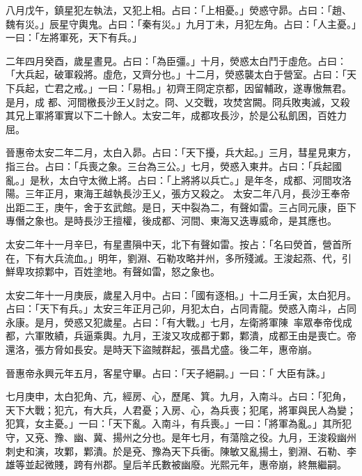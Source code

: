 \begin{pinyinscope}
 八月戊午，鎮星犯左執法，又犯上相。占曰：「上相憂。」熒惑守昴。占曰：「趙、魏有災。」辰星守輿鬼。占曰：「秦有災。」九月丁未，月犯左角。占曰：「人主憂。」一曰：「左將軍死，天下有兵。」



 二年四月癸酉，歲星晝見。占曰：「為臣彊。」十月，熒惑太白鬥于虛危。占曰：「大兵起，破軍殺將。虛危，又齊分也。」十二月，熒惑襲太白于營室。占曰：「天下兵起，亡君之戒。」一曰：「易相。」初齊王冏定京都，因留輔政，遂專慠無君。是月，成
 都、河間檄長沙王乂討之。冏、乂交戰，攻焚宮闕。冏兵敗夷滅，又殺其兄上軍將軍實以下二十餘人。太安二年，成都攻長沙，於是公私飢困，百姓力屈。



 晉惠帝太安二年二月，太白入昴。占曰：「天下擾，兵大起。」三月，彗星見東方，指三台。占曰：「兵喪之象。三台為三公。」七月，熒惑入東井。占曰：「兵起國亂。」是秋，太白守太微上將。占曰：「上將將以兵亡。」是年冬，成都、河間攻洛陽。三年正月，東海王越執長沙王乂，張方又殺之。
 太安二年八月，長沙王奉帝出距二王，庚午，舍于玄武館。是日，天中裂為二，有聲如雷。三占同元康，臣下專僭之象也。是時長沙王擅權，後成都、河間、東海又迭專威命，是其應也。



 太安二年十一月辛巳，有星晝隕中天，北下有聲如雷。按占：「名曰熒首，營首所在，下有大兵流血。」明年，劉淵、石勒攻略并州，多所殘滅。王浚起燕、代，引鮮卑攻掠鄴中，百姓塗地。有聲如雷，怒之象也。



 太安二年十一月庚辰，歲星入月中。占曰：「國有逐相。」十二月壬寅，太白犯月。占曰：「天下有兵。」太安三年正月己卯，月犯太白，占同青龍。熒惑入南斗，占同永康。是月，熒惑又犯歲星。占曰：「有大戰。」七月，左衛將軍陳率眾奉帝伐成都，六軍敗績，兵逼乘輿。九月，王浚又攻成都于鄴，鄴潰，成都王由是喪亡。帝還洛，張方脅如長安。是時天下盜賊群起，張昌尤盛。後二年，惠帝崩。



 晉惠帝永興元年五月，客星守畢。占曰：「天子絕嗣。」一曰：「
 大臣有誅。」



 七月庚申，太白犯角、亢，經房、心，歷尾、箕。九月，入南斗。占曰：「犯角，天下大戰；犯亢，有大兵，人君憂；入房、心，為兵喪；犯尾，將軍與民人為變；犯箕，女主憂。」一曰：「天下亂。入南斗，有兵喪。」一曰：「將軍為亂。」其所犯守，又兗、豫、幽、冀、揚州之分也。是年七月，有蕩陰之役。九月，王浚殺幽州刺史和演，攻鄴，鄴潰。於是兗、豫為天下兵衝。陳敏又亂揚土，劉淵、石勒、李雄等並起微賤，跨有州郡。皇后羊氏數被幽廢。光熙元年，惠帝崩，終無繼嗣。




\end{pinyinscope}
